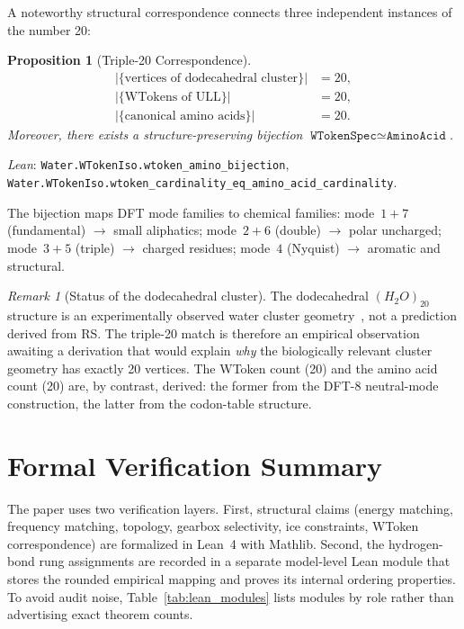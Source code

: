 \documentclass[12pt,a4paper]{article}
\newtheorem{proposition}[theorem]{Proposition}
\theoremstyle{definition}
\theoremstyle{remark}
\newtheorem{remark}[theorem]{Remark}
\begin{document}
A noteworthy structural correspondence connects three independent
instances of the number 20:

\begin{proposition}[Triple-20 Correspondence]
\begin{align}
  |\{\text{vertices of dodecahedral cluster}\}| &= 20, \\
  |\{\text{WTokens of ULL}\}| &= 20, \\
  |\{\text{canonical amino acids}\}| &= 20.
\end{align}
Moreover, there exists a structure-preserving bijection
$\texttt{WTokenSpec} \simeq \texttt{AminoAcid}$.
\end{proposition}

\noindent
\textit{Lean}: \texttt{Water.WTokenIso.wtoken\_amino\_bijection},
\texttt{Water.WTokenIso.wtoken\_cardinality\_eq\_amino\_acid\_cardinality}.

The bijection maps DFT mode families to chemical families:
mode~$1{+}7$ (fundamental) $\to$ small aliphatics;
mode~$2{+}6$ (double) $\to$ polar uncharged;
mode~$3{+}5$ (triple) $\to$ charged residues;
mode~$4$ (Nyquist) $\to$ aromatic and structural.

\begin{remark}[Status of the dodecahedral cluster]
The dodecahedral $(H_2O)_{20}$ structure is an experimentally observed
water cluster geometry~\cite{Pollack2013}, not a prediction derived
from RS.  The triple-20 match is therefore an empirical observation
awaiting a derivation that would explain \emph{why} the biologically
relevant cluster geometry has exactly 20 vertices.  The WToken count
(20) and the amino acid count (20) are, by contrast, derived: the
former from the DFT-8 neutral-mode construction, the latter from the
codon-table structure.
\end{remark}

\section{Formal Verification Summary}
\label{sec:lean}

The paper uses two verification layers.  First, structural claims
(energy matching, frequency matching, topology, gearbox selectivity,
ice constraints, WToken correspondence) are formalized in Lean~4 with
Mathlib.  Second, the hydrogen-bond rung assignments are recorded in a
separate model-level Lean module that stores the rounded empirical
mapping and proves its internal ordering properties.  To avoid audit
noise, Table~\ref{tab:lean_modules} lists modules by role rather than
advertising exact theorem counts.
\end{document}
